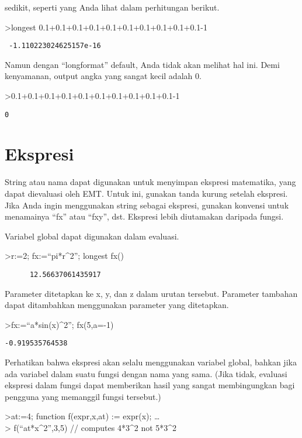\documentclass[
]{book}
\begin{document}
sedikit, seperti yang Anda lihat dalam perhitungan berikut.

\textgreater longest 0.1+0.1+0.1+0.1+0.1+0.1+0.1+0.1+0.1+0.1-1

\begin{verbatim}
 -1.110223024625157e-16 
\end{verbatim}

Namun dengan ``longformat'' default, Anda tidak akan melihat hal ini. Demi kenyamanan, output angka yang sangat kecil adalah 0.

\textgreater0.1+0.1+0.1+0.1+0.1+0.1+0.1+0.1+0.1+0.1-1

\begin{verbatim}
0
\end{verbatim}

\chapter{Ekspresi}\label{ekspresi}

String atau nama dapat digunakan untuk menyimpan ekspresi matematika, yang dapat dievaluasi oleh EMT. Untuk ini, gunakan tanda kurung setelah ekspresi. Jika Anda ingin menggunakan string sebagai ekspresi, gunakan konvensi untuk menamainya ``fx'' atau ``fxy'', dst. Ekspresi lebih diutamakan daripada fungsi.

Variabel global dapat digunakan dalam evaluasi.

\textgreater r:=2; fx:=``pi*r\^{}2''; longest fx()

\begin{verbatim}
      12.56637061435917 
\end{verbatim}

Parameter ditetapkan ke x, y, dan z dalam urutan tersebut. Parameter tambahan dapat ditambahkan menggunakan parameter yang ditetapkan.

\textgreater fx:=``a*sin(x)\^{}2''; fx(5,a=-1)

\begin{verbatim}
-0.919535764538
\end{verbatim}

Perhatikan bahwa ekspresi akan selalu menggunakan variabel global, bahkan jika ada variabel dalam suatu fungsi dengan nama yang sama. (Jika tidak, evaluasi ekspresi dalam fungsi dapat memberikan hasil yang sangat membingungkan bagi pengguna yang memanggil fungsi tersebut.)

\textgreater at:=4; function f(expr,x,at) := expr(x); \ldots{}\\
\textgreater{} f(``at*x\^{}2'',3,5) // computes 4*3\^{}2 not 5*3\^{}2
\end{document}
